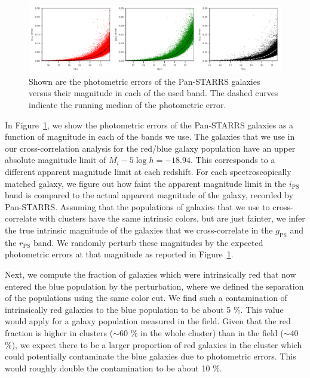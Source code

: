 \documentclass[iop, apjl, twocolappendix, numberedappendix]{emulateapj}
\begin{document}
\begin{figure}
    \includegraphics[width= \textwidth]{mag_errors.pdf}
\caption{Shown are the photometric errors of the Pan-STARRS galaxies versus
their magnitude in each of the used band. The dashed curves indicate the running
median of the photometric error.}
   \label{fig:mag_errors} 
\end{figure}

In Figure~\ref{fig:mag_errors}, we show the photometric errors of the Pan-STARRS
galaxies as a function of magnitude in each of the bands we use. The
galaxies that we use in our cross-correlation analysis for the red/blue
galaxy population have an upper absolute magnitude limit of $M_{i}-5\log h=-18.94$. This
corresponds to a different apparent magnitude limit at each redshift.
For each spectroscopically matched galaxy, we figure out how faint the
apparent magnitude limit in the $i_{\mathrm{PS}}$ band is compared to the actual
apparent magnitude of the galaxy, recorded by Pan-STARRS. Assuming that the populations of
galaxies that we use to cross-correlate with clusters have the same
intrinsic colors, but are just fainter, we infer the true
intrinsic magnitude of the galaxies that we cross-correlate in the
$g_{\mathrm{PS}}$ and the $r_{\mathrm{PS}}$ band. We randomly perturb these magnitudes 
by the expected photometric errors at that magnitude as reported in Figure~\ref{fig:mag_errors}.

Next, we compute the fraction of galaxies which were intrinsically red
that now entered the blue population by the perturbation, where we
defined the separation of the populations using the same color
cut. We find such a contamination of intrinsically red galaxies to
the blue population to be about 5 \%. This value would apply for a galaxy population
measured in the field. Given that the red fraction is higher in clusters ($\sim
60$ \% in the whole cluster) than in the field ($\sim 40$ \%),
we expect there to be a larger proportion of red galaxies in the cluster which could
potentially contaminate the blue galaxies due to photometric errors.
This would roughly double the contamination to be about 10 \%.
\end{document}
